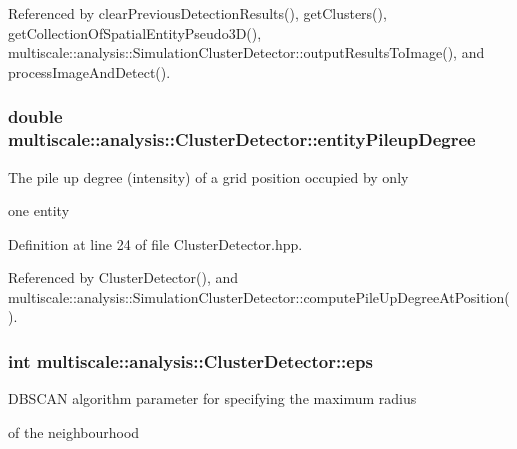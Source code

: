 Referenced by clear\-Previous\-Detection\-Results(), get\-Clusters(), get\-Collection\-Of\-Spatial\-Entity\-Pseudo3\-D(), multiscale\-::analysis\-::\-Simulation\-Cluster\-Detector\-::output\-Results\-To\-Image(), and process\-Image\-And\-Detect().

\hypertarget{classmultiscale_1_1analysis_1_1ClusterDetector_aaa93a4b3a5a3c4279aa434669093ac40}{
\subsubsection[{entity\-Pileup\-Degree}]{\setlength{\rightskip}{0pt plus 5cm}double multiscale\-::analysis\-::\-Cluster\-Detector\-::entity\-Pileup\-Degree\hspace{0.3cm}{\ttfamily [protected]}}}\label{classmultiscale_1_1analysis_1_1ClusterDetector_aaa93a4b3a5a3c4279aa434669093ac40}
\begin{DoxyVerb}      The pile up degree (intensity) of a grid position occupied by only
\end{DoxyVerb}
 one entity 

Definition at line 24 of file Cluster\-Detector.\-hpp.



Referenced by Cluster\-Detector(), and multiscale\-::analysis\-::\-Simulation\-Cluster\-Detector\-::compute\-Pile\-Up\-Degree\-At\-Position().

\hypertarget{classmultiscale_1_1analysis_1_1ClusterDetector_a61e876f87d62245eada8f56d587d39cd}{
\subsubsection[{eps}]{\setlength{\rightskip}{0pt plus 5cm}int multiscale\-::analysis\-::\-Cluster\-Detector\-::eps\hspace{0.3cm}{\ttfamily [protected]}}}\label{classmultiscale_1_1analysis_1_1ClusterDetector_a61e876f87d62245eada8f56d587d39cd}
\begin{DoxyVerb}                        DBSCAN algorithm parameter for specifying the maximum radius
\end{DoxyVerb}
 of the neighbourhood 

